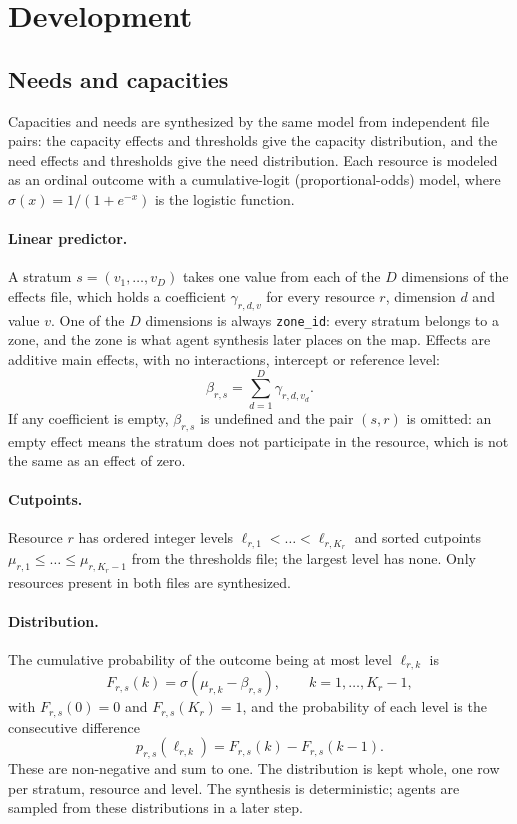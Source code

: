 \section{Development}

\subsection{Needs and capacities}

Capacities and needs are synthesized by the same model from independent file pairs: the
capacity effects and thresholds give the capacity distribution, and the need effects and
thresholds give the need distribution. Each resource is modeled as an ordinal outcome with
a cumulative-logit (proportional-odds) model, where $\sigma(x) = 1 / (1 + e^{-x})$ is the
logistic function.

\paragraph{Linear predictor.}
A stratum $s = (v_1, \dots, v_D)$ takes one value from each of the $D$ dimensions of the
effects file, which holds a coefficient $\gamma_{r,d,v}$ for every resource $r$, dimension
$d$ and value $v$. One of the $D$ dimensions is always \texttt{zone\_id}: every stratum
belongs to a zone, and the zone is what agent synthesis later places on the map. Effects
are additive main effects, with no interactions, intercept or reference level:
\begin{equation}
  \beta_{r,s} = \sum_{d=1}^{D} \gamma_{r,d,v_d}.
\end{equation}
If any coefficient is empty, $\beta_{r,s}$ is undefined and the pair $(s, r)$ is omitted:
an empty effect means the stratum does not participate in the resource, which is not the
same as an effect of zero.

\paragraph{Cutpoints.}
Resource $r$ has ordered integer levels $\ell_{r,1} < \dots < \ell_{r,K_r}$ and sorted
cutpoints $\mu_{r,1} \le \dots \le \mu_{r,K_r-1}$ from the thresholds file; the largest
level has none. Only resources present in both files are synthesized.

\paragraph{Distribution.}
The cumulative probability of the outcome being at most level $\ell_{r,k}$ is
\begin{equation}
  F_{r,s}(k) = \sigma\left(\mu_{r,k} - \beta_{r,s}\right),
  \qquad k = 1, \dots, K_r - 1,
\end{equation}
with $F_{r,s}(0) = 0$ and $F_{r,s}(K_r) = 1$, and the probability of each level is the
consecutive difference
\begin{equation}
  p_{r,s}(\ell_{r,k}) = F_{r,s}(k) - F_{r,s}(k-1).
\end{equation}
These are non-negative and sum to one. The distribution is kept whole, one row per stratum,
resource and level. The synthesis is deterministic; agents are sampled from these
distributions in a later step.

